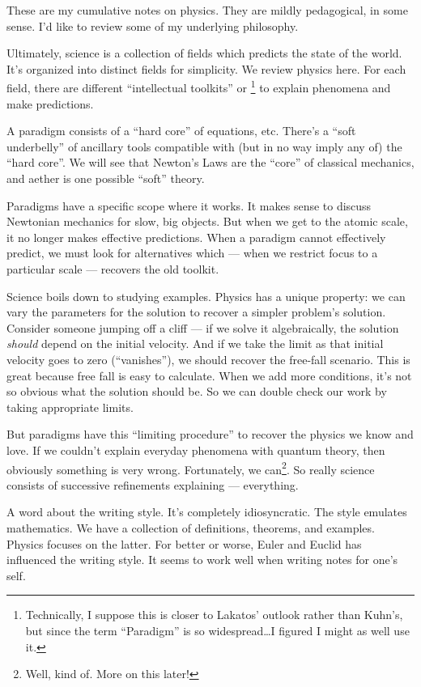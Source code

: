 
\M
These are my cumulative notes on physics. They are mildly pedagogical,
in some sense. I'd like to review some of my underlying philosophy.

Ultimately, science is a collection of fields which predicts the state
of the world. It's organized into distinct fields for simplicity. We
review physics here. For each field, there are different ``intellectual
toolkits'' or \footnote{Technically, I suppose this is
closer to Lakatos' outlook rather than Kuhn's, but since the term
``Paradigm'' is so widespread\dots I figured I might as well use it.} 
to explain phenomena and make predictions.

\M A paradigm consists of a ``hard core'' of equations, etc. There's a
``soft underbelly'' of ancillary tools compatible with (but in no way
imply any of) the ``hard core''. We will see that Newton's Laws are the
``core'' of classical mechanics, and aether is one possible ``soft''
theory.   

Paradigms have a specific scope where it works. It makes sense to
discuss Newtonian mechanics for slow, big objects. But when we get to
the atomic scale, it no longer makes effective predictions. When a
paradigm cannot effectively predict, we must look for alternatives which
--- when we restrict focus to a particular scale --- recovers the old
toolkit. 

\M Science boils down to studying examples. Physics has a unique
property: we can vary the parameters for the solution to recover a
simpler problem's solution. Consider someone jumping off a cliff --- if
we solve it algebraically, the solution \emph{should} depend on the
initial velocity. And if we take the limit as that initial velocity goes
to zero (``vanishes''), we should recover the free-fall scenario. This
is great because free fall is easy to calculate. When we add more
conditions, it's not so obvious what the solution should be. So we can
double check our work by taking appropriate limits.

But paradigms have this ``limiting procedure'' to recover the physics we
know and love. If we couldn't explain everyday phenomena with quantum
theory, then obviously something is very wrong. Fortunately, we
can\footnote{Well, kind of. More on this later!}. So really science
consists of successive refinements explaining --- everything.

\M A word about the writing style. It's completely
idiosyncratic. The style emulates mathematics. We have a collection of
definitions, theorems, and examples. Physics focuses on the latter. For
better or worse, Euler and Euclid has influenced the writing style. It
seems to work well when writing notes for one's self. 

